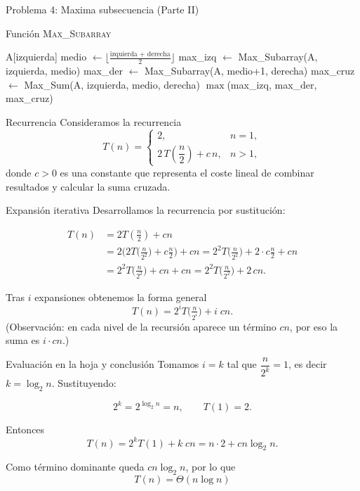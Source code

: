 \documentclass{beamer}
\begin{document}
\begin{frame}{Problema 4: Maxima subsecuencia (Parte II)}
\begin{algorithm}[H]
\caption{Función \textsc{Max\_Subarray}}
\begin{algorithmic}[1]
    \State \Return A[izquierda]
  \EndIf
  \State medio $\gets \lfloor \tfrac{\text{izquierda + derecha}}{2} \rfloor$
  \State max\_izq $\gets$ Max\_Subarray(A, izquierda, medio)
  \State max\_der $\gets$ Max\_Subarray(A, medio+1, derecha)
  \State max\_cruz $\gets$ Max\_Sum(A, izquierda, medio, derecha)
  \State \Return $\max$(max\_izq, max\_der, max\_cruz)
\EndFunction
\end{algorithmic}
\end{algorithm}
\end{frame}

\begin{frame}{Recurrencia}
Consideramos la recurrencia
\[
T(n)=
\begin{cases}
2, & n=1,\\[6pt]
2\,T\!\left(\dfrac{n}{2}\right) + c\,n, & n>1,
\end{cases}
\]
donde \(c>0\) es una constante que representa el coste lineal de combinar resultados y calcular la suma cruzada.
\end{frame}

\begin{frame}{Expansión iterativa}
Desarrollamos la recurrencia por sustitución:

\[
\begin{aligned}
T(n) &= 2T\!\left(\tfrac{n}{2}\right) + c n\\[4pt]
     &= 2\Big(2T\!\big(\tfrac{n}{2^2}\big) + c\tfrac{n}{2}\Big) + c n
      = 2^2 T\!\big(\tfrac{n}{2^2}\big) + 2\cdot c\tfrac{n}{2} + c n\\[4pt]
     &= 2^2 T\!\big(\tfrac{n}{2^2}\big) + c n + c n
     = 2^2 T\!\big(\tfrac{n}{2^2}\big) + 2\,c n.
\end{aligned}
\]

Tras \(i\) expansiones obtenemos la forma general
\[
T(n)=2^{i}T\!\big(\tfrac{n}{2^{i}}\big) + i\; c n.
\]
(Observación: en cada nivel de la recursión aparece un término \(c n\), por eso la suma es \(i\cdot c n\).)
\end{frame}

\begin{frame}{Evaluación en la hoja y conclusión}
Tomamos \(i=k\) tal que \(\dfrac{n}{2^{k}}=1\), es decir \(k=\log_2 n\). Sustituyendo:

\[
2^{k}=2^{\log_2 n}=n,\qquad T(1)=2.
\]

Entonces
\[
T(n)=2^{k}T(1) + k\; c n = n\cdot 2 + c n \log_2 n.
\]

Como término dominante queda \(c n \log_2 n\), por lo que
\[
\boxed{\,T(n)=\Theta(n\log n)\,}
\]


\end{frame}
\end{document}
